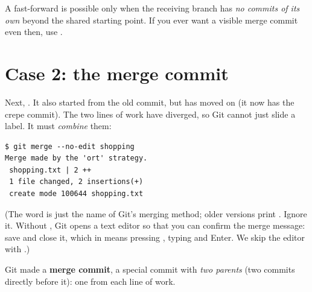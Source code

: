 \begin{quickfact}
A fast-forward is possible only when the receiving branch has \emph{no commits of its own} beyond the shared starting point. If you ever want a visible merge commit even then, use .
\end{quickfact}

\section{Case 2: the merge commit}

Next, . It also started from the old  commit, but  has moved on (it now has the crepe commit). The two lines of work have diverged, so Git cannot just slide a label. It must \emph{combine} them:

\begin{lstlisting}
$ git merge --no-edit shopping
Merge made by the 'ort' strategy.
 shopping.txt | 2 ++
 1 file changed, 2 insertions(+)
 create mode 100644 shopping.txt
\end{lstlisting}

(The word  is just the name of Git's merging method; older versions print . Ignore it. Without , Git opens a text editor so that you can confirm the merge message: save and close it, which in  means pressing , typing  and Enter. We skip the editor with .)

Git made a \textbf{merge commit}, a special commit with \emph{two parents} (two commits directly before it): one from each line of work.

